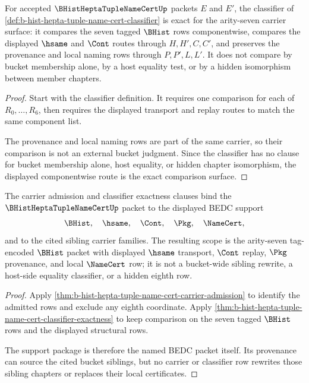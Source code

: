 \begin{theorem}
\label{thm:b-hist-hepta-tuple-name-cert-classifier-exactness}
For accepted $\BHistHeptaTupleNameCertUp$ packets $E$ and $E'$, the classifier of \autoref{def:b-hist-hepta-tuple-name-cert-classifier} is exact for the arity-seven carrier surface: it compares the seven tagged $\BHist$ rows componentwise, compares the displayed $\hsame$ and $\Cont$ routes through $H,H',C,C'$, and preserves the provenance and local naming rows through $P,P',L,L'$. It does not compare by bucket membership alone, by a host equality test, or by a hidden isomorphism between member chapters.
\end{theorem}
\begin{proof}
Start with the classifier definition. It requires one comparison for each of $R_0,\ldots,R_6$, then requires the displayed transport and replay routes to match the same component list.

The provenance and local naming rows are part of the same carrier, so their comparison is not an external bucket judgment. Since the classifier has no clause for bucket membership alone, host equality, or hidden chapter isomorphism, the displayed componentwise route is the exact comparison surface.
\end{proof}

\begin{theorem}
\label{thm:b-hist-hepta-tuple-name-cert-scoped-support-package}
The carrier admission and classifier exactness clauses bind the $\BHistHeptaTupleNameCertUp$ packet to the displayed BEDC support
$$
\BHist,\quad \hsame,\quad \Cont,\quad \Pkg,\quad \NameCert,
$$
and to the cited sibling carrier families. The resulting scope is the arity-seven tag-encoded $\BHist$ packet with displayed $\hsame$ transport, $\Cont$ replay, $\Pkg$ provenance, and local $\NameCert$ row; it is not a bucket-wide sibling rewrite, a host-side equality classifier, or a hidden eighth row.
\end{theorem}
\begin{proof}
Apply \autoref{thm:b-hist-hepta-tuple-name-cert-carrier-admission} to identify the admitted rows and exclude any eighth coordinate. Apply \autoref{thm:b-hist-hepta-tuple-name-cert-classifier-exactness} to keep comparison on the seven tagged $\BHist$ rows and the displayed structural rows.

The support package is therefore the named BEDC packet itself. Its provenance can source the cited bucket siblings, but no carrier or classifier row rewrites those sibling chapters or replaces their local certificates.
\end{proof}

